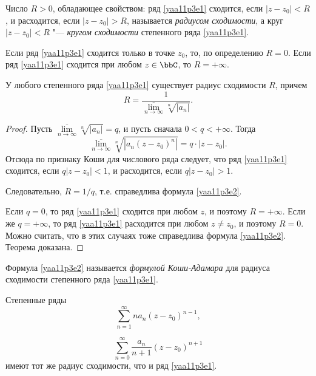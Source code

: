 \begin{defn}
Число $R>0$, обладающее свойством: ряд \eqref{yaa11p3e1} сходится, если $|z-z_0|<R$, и расходится, если $|z-z_0|>R$, называется \textit{радиусом сходимости}, а круг $|z-z_0|<R$ "--- \textit{кругом сходимости} степенного ряда \eqref{yaa11p3e1}.

Если ряд \eqref{yaa11p3e1} сходится только в точке $z_0$, то, по определению $R=0$. Если ряд \eqref{yaa11p3e1} сходится при любом $z\in\bbC$, то $R=+\infty$.
\end{defn}

\begin{thm}
У любого степенного ряда \eqref{yaa11p3e1} существует радиус сходимости $R$, причем
\begin{equation}\label{yaa11p3e2}
R=\frac{1}{\overline{\lim\limits_{n\to\infty}}\sqrt[n]{|a_n|}}.
\end{equation} 
\end{thm}

\begin{proof}
Пусть $\overline{\lim\limits_{n\to\infty}}\sqrt[n]{|a_n|}=q$, и пусть сначала $0<q<+\infty$. Тогда
$$
\overline{\lim\limits_{n\to\infty}}\sqrt[n]{|a_n(z-z_0)^n|}=q\cdot |z-z_0|.
$$
Отсюда по признаку Коши для числового ряда следует, что ряд \eqref{yaa11p3e1} сходится, если $q|z-z_0|<1$, и расходится, если $q|z-z_0|>1$.

Следовательно, $R=1/q$, т.е. справедлива формула \eqref{yaa11p3e2}.

Если $q=0$, то ряд \eqref{yaa11p3e1} сходится при любом $z$, и поэтому $R=+\infty$. Если же $q=+\infty$, то ряд \eqref{yaa11p3e1} расходится при любом $z\ne z_0$, и поэтому $R=0$. Можно считать, что в этих случаях тоже справедлива формула \eqref{yaa11p3e2}. Теорема доказана.
\end{proof}

Формула \eqref{yaa11p3e2} называется \textit{формулой Коши-Адамара} для радиуса сходимости степенного ряда \eqref{yaa11p3e1}.

\begin{thm} \label{yaa11p3thm3}
Степенные ряды
\begin{equation}\label{yaa11p3e5}
\sum\limits_{n=1}^{\infty} na_n(z-z_0)^{n-1},
\end{equation}

\begin{equation}\label{yaa11p3e6}
\sum\limits_{n=0}^{\infty}\frac{a_n}{n+1}(z-z_0)^{n+1}
\end{equation}
имеют тот же радиус сходимости, что и ряд \eqref{yaa11p3e1}.
\end{thm}

